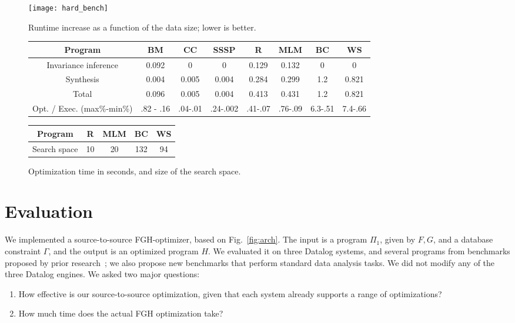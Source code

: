     \begin{figure*}
        \centering
        \texttt{[image: hard\_bench]}
        \caption{Runtime increase as a function of the data size; lower is  better.}\label{fig:eval:hard}
    \end{figure*}
    
    \begin{figure*}
      \centering
     \begin{tabular}{ c | c c c | c c c c }
     Program & BM & CC & SSSP & R & MLM & BC & WS \\
     \hline
     Invariance inference & 0.092 & 0 & 0 & 0.129 & 0.132 & 0 & 0\\
     Synthesis & 0.004 & 0.005 & 0.004 & 0.284 & 0.299 & 1.2 & 0.821 \\
     \hline
     Total & 0.096 & 0.005 & 0.004 & 0.413 & 0.431 & 1.2 & 0.821 \\
     Opt. / Exec. (max\%-min\%) & .82 - .16 & .04-.01 & .24-.002 & .41-.07 & .76-.09 & 6.3-.51 & 7.4-.66
    \end{tabular}

    \vspace{1em}

    \begin{tabular}{ c | c c c c }
     Program & R & MLM & BC & WS \\
     \hline
     Search space & 10 & 20 & 132 & 94 \\
    \end{tabular}
      \caption{Optimization time in seconds, 
       and  size of the search space. }
      \label{fig:synthesis:time:space}
    \end{figure*}
    
    \section{Evaluation}\label{sec:eval}
    
    We implemented a source-to-source FGH-optimizer, based on
    Fig.~\ref{fig:arch}.  The input is a program $\Pi_1$, given by $F, G$,
    and a database constraint $\Gamma$, and the output is an optimized
    program $H$.  We evaluated it on three Datalog systems, and several
    programs from benchmarks proposed by prior
    research~\cite{BigDatalog, DBLP:journals/pvldb/FanZZAKP19}; we also
    propose new benchmarks that perform standard data analysis tasks.  We
    did not modify any of the three Datalog engines.  We asked two major
    questions:
    \begin{enumerate}
    \item How effective is our source-to-source optimization, given that
      each system already supports a range of optimizations?
    \item How much time does the actual FGH optimization take?
    \end{enumerate}
    
